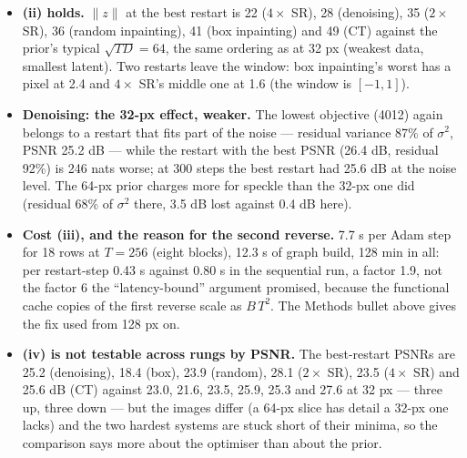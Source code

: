 \documentclass[11pt]{article}
\begin{document}
\begin{itemize}
        and even the well-posed systems show it: the denoising restarts are
        200 nats apart (4012, 4208, 4258) with PSNR 23.7--26.4 dB.
  \item \textbf{(ii) holds.} $\|z\|$ at the best restart is 22 ($4\times$
        SR), 28 (denoising), 35 ($2\times$ SR), 36 (random inpainting), 41
        (box inpainting) and 49 (CT) against the prior's typical $\sqrt{TD}
        = 64$, the same ordering as at 32 px (weakest data, smallest
        latent). Two restarts leave the window: box inpainting's worst has a
        pixel at 2.4 and $4\times$ SR's middle one at 1.6 (the window is
        $[-1, 1]$).
  \item \textbf{Denoising: the 32-px effect, weaker.} The lowest objective
        (4012) again belongs to a restart that fits part of the noise ---
        residual variance 87\% of $\sigma^2$, PSNR 25.2 dB --- while the
        restart with the best PSNR (26.4 dB, residual 92\%) is 246 nats
        worse; at 300 steps the best restart had 25.6 dB at the noise level.
        The 64-px prior charges more for speckle than the 32-px one did
        (residual 68\% of $\sigma^2$ there, 3.5 dB lost against 0.4 dB
        here).
  \item \textbf{Cost (iii), and the reason for the second reverse.} 7.7 s
        per Adam step for 18 rows at $T = 256$ (eight blocks), 12.3 s of
        graph build, 128 min in all: per restart-step 0.43 s against 0.80 s
        in the sequential run, a factor 1.9, not the factor 6 the
        ``latency-bound'' argument promised, because the functional cache
        copies of the first reverse scale as $B\,T^2$. The Methods bullet
        above gives the fix used from 128 px on.
  \item \textbf{(iv) is not testable across rungs by PSNR.} The best-restart
        PSNRs are 25.2 (denoising), 18.4 (box), 23.9 (random), 28.1
        ($2\times$ SR), 23.5 ($4\times$ SR) and 25.6 dB (CT) against 23.0,
        21.6, 23.5, 25.9, 25.3 and 27.6 at 32 px --- three up, three down ---
        but the images differ (a 64-px slice has detail a 32-px one lacks)
        and the two hardest systems are stuck short of their minima, so the
        comparison says more about the optimiser than about the prior.
\end{itemize}
\end{document}
